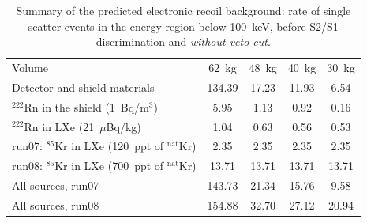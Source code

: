 \begin{table}[!h]
\centering
\caption[Summary of the predicted electronic recoil background without veto cut]{Summary of the predicted electronic recoil background: rate of single scatter events in the energy region below 100~keV, before S2/S1 discrimination and {\it without veto cut}.}
\label{tabSummaryElectronRecoilsPassiveVeto}
\begin{tabular}{>{\footnotesize}l |>{\footnotesize} c |>{\footnotesize} c |>{\footnotesize} c |>{\footnotesize} c }
\hline
&  \multicolumn{4}{>{\footnotesize}c}{[$\times$10$^{-3}$ events$\cdot$kg$^{-1}\cdot$day$^{-1}\cdot$keV$^{-1}$]}\\
\hline
Volume &  62~kg & 48~kg & 40~kg & 30~kg \\
\hline
Detector and shield materials			& 134.39 	& 17.23	& 11.93	  	& 6.54  	\\
$^{222}$Rn in the shield (1~Bq/m$^{3}$)	& 5.95 	& 1.13	& 0.92	  	& 0.16 	\\
$^{222}$Rn in LXe (21~$\mu$Bq/kg)	& 1.04   	& 0.63	& 0.56 	       	& 0.53  	\\
run07: $^{85}$Kr in LXe (120~ppt of $^{\mathrm{nat}}$Kr) 	& 2.35   	&  2.35	& 2.35 	 	& 2.35  	\\
run08: $^{85}$Kr in LXe (700~ppt of $^{\mathrm{nat}}$Kr) 	& 13.71   	&  13.71	& 13.71 	 	& 13.71  	\\
\hline
All sources, run07  					& 143.73	& 21.34 	& 15.76 	     	& 9.58  	\\
All sources, run08  					& 154.88	& 32.70 	&  27.12		& 20.94  	\\
\hline
\end{tabular}
\end{table}

